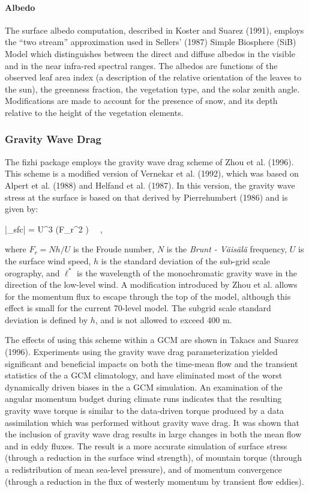\paragraph{Albedo}
The surface albedo computation, described in Koster and Suarez (1991),
employs the ``two stream'' approximation used in Sellers' (1987) Simple Biosphere (SiB)
Model which distinguishes between the direct and diffuse albedos in the visible
and in the near infra-red spectral ranges. The albedos are functions of the observed
leaf area index (a description of the relative orientation of the leaves to the
sun), the greenness fraction, the vegetation type, and the solar zenith angle.
Modifications are made to account for the presence of snow, and its depth relative
to the height of the vegetation elements.

\subsubsection{Gravity Wave Drag}
The fizhi package employs the gravity wave drag scheme of Zhou et al. (1996).
This scheme is a modified version of Vernekar et al. (1992),
which was based on Alpert et al. (1988) and Helfand et al. (1987).  
In this version, the gravity wave stress at the surface is
based on that derived by Pierrehumbert (1986) and is given by:

\bq
|\vec{\tau}_{sfc}| = {\rho U^3} \left(F_r^2 \right) \, \, ,
\eq

where $F_r = N h /U$ is the Froude number, $N$ is the {\em Brunt - V\"{a}is\"{a}l\"{a}} frequency, $U$ is the 
surface wind speed, $h$ is the standard deviation of the sub-grid scale orography,
and $\ell^*$ is the wavelength of the monochromatic gravity wave in the direction of the low-level wind.
A modification introduced by Zhou et al. allows for the momentum flux to
escape through the top of the model, although this effect is small for the current 70-level model.  
The subgrid scale standard deviation is defined by $h$, and is not allowed to exceed 400 m. 

The effects of using this scheme within a GCM are shown in Takacs and Suarez (1996).
Experiments using the gravity wave drag parameterization yielded significant and
beneficial impacts on both the time-mean flow and the transient statistics of the
a GCM climatology, and have eliminated most of the worst dynamically driven biases 
in the a GCM simulation. 
An examination of the angular momentum budget during climate runs indicates that the 
resulting gravity wave torque is similar to the data-driven torque produced by a data 
assimilation which was performed without gravity
wave drag.  It was shown that the inclusion of gravity wave drag results in 
large changes in both the mean flow and in eddy fluxes.
The result is a more
accurate simulation of surface stress (through a reduction in the surface wind strength), 
of mountain torque (through a redistribution of mean sea-level pressure), and of momentum
convergence (through a reduction in the flux of westerly momentum by transient flow eddies).  


